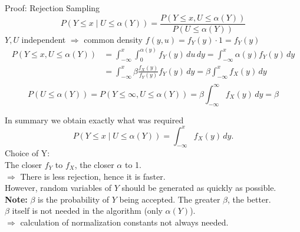 \documentclass[11pt,compress,t,notes=noshow, xcolor=table]{beamer}
\begin{document}
\begin{vbframe}{Proof: Rejection Sampling}
$$ P(Y\le x \mid U\le \alpha(Y)) = \frac{P(Y\le x, U\le \alpha(Y))}{P(U\le\alpha(Y))}
$$
$Y, U$ independent $\Rightarrow$ common density $f(y,u)=f_Y(y)\cdot 1=f_Y(y)$
\begin{align*}
P(Y\le x, U\le\alpha(Y)) &= \int_{-\infty}^{x}\int_{0}^{\alpha(y)}f_Y(y)\,du\,dy
=\int_{-\infty}^{x}\alpha(y) f_Y(y)\,dy\\
&=\int_{-\infty}^{x}\beta\frac{f_X(y)}{f_Y(y)} f_Y(y)\,dy
=\beta\int_{-\infty}^{x}f_X(y)\,dy\\
\end{align*}
$$P(U\le\alpha(Y)) = P(Y\le\infty,U\le\alpha(Y))
                 = \beta\int_{-\infty}^{\infty}f_X(y)\,dy=\beta
$$

\framebreak

In summary we obtain exactly what was required
$$
P(Y\le x \mid U\le \alpha(Y)) = \int_{-\infty}^{x}f_X(y)\,dy.
$$
Choice of Y:\\
The closer $f_Y$ to $f_X$, the closer $\alpha$ to 1.\\
$\Rightarrow$ There is less rejection, hence it is faster.\\
\medskip
However, random variables of $Y$ should be generated as quickly as possible.\\
\medskip
\textbf{Note:} $\beta$ is the probability of $Y$ being accepted. The greater $\beta$, the better.\\
\medskip
$\beta$ itself is not needed in the algorithm (only $\alpha(Y)$).\\ $\Rightarrow$ calculation of normalization constants not always needed.
\end{vbframe}
\end{document}

